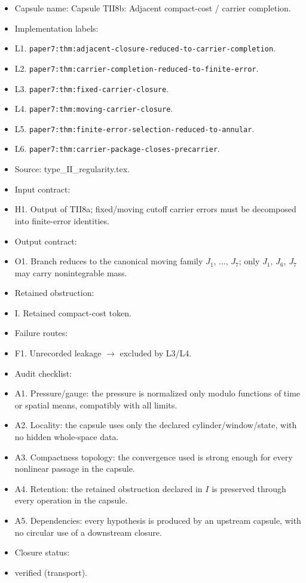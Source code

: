 \documentclass[11pt]{amsart}
\begin{document}
\begin{itemize}
  \item Capsule name: Capsule TII8b: Adjacent compact-cost / carrier completion.
  \item Implementation labels:
  \item L1. \texttt{paper7:thm:adjacent-closure-reduced-to-carrier-completion}.
  \item L2. \texttt{paper7:thm:carrier-completion-reduced-to-finite-error}.
  \item L3. \texttt{paper7:thm:fixed-carrier-closure}.
  \item L4. \texttt{paper7:thm:moving-carrier-closure}.
  \item L5. \texttt{paper7:thm:finite-error-selection-reduced-to-annular}.
  \item L6. \texttt{paper7:thm:carrier-package-closes-precarrier}.
  \item Source: type\_II\_regularity.tex.
  \item Input contract:
  \item H1. Output of TII8a; fixed/moving cutoff carrier errors must be decomposed into finite-error identities.
  \item Output contract:
  \item O1. Branch reduces to the canonical moving family $J_1$, ..., $J_7$; only $J_1$, $J_6$, $J_7$ may carry nonintegrable mass.
  \item Retained obstruction:
  \item I. Retained compact-cost token.
  \item Failure routes:
  \item F1. Unrecorded leakage $\to$ excluded by L3/L4.
  \item Audit checklist:
  \item A1. Pressure/gauge: the pressure is normalized only modulo functions of time or spatial means, compatibly with all limits.
  \item A2. Locality: the capsule uses only the declared cylinder/window/state, with no hidden whole-space data.
  \item A3. Compactness topology: the convergence used is strong enough for every nonlinear passage in the capsule.
  \item A4. Retention: the retained obstruction declared in $I$ is preserved through every operation in the capsule.
  \item A5. Dependencies: every hypothesis is produced by an upstream capsule, with no circular use of a downstream closure.
  \item Closure status:
  \item verified (transport).
\end{itemize}
\end{document}
